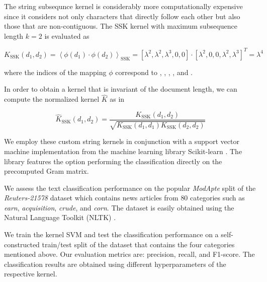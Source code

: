 
The string subsequnce kernel is considerably more computationally expensive since it considers not only characters that directly follow each other but also those that are non-contiguous. The SSK kernel with maximum subsequence length $k = 2$ is evaluated as

\begin{equation} \label{eq:ssk}
  K_\text{SSK}(d_1, d_2) = \left\langle \phi(d_1) \cdot \phi(d_2) \right\rangle_\text{SSK} = [\lambda^2, \lambda^2, \lambda^3, 0, 0] \cdot [\lambda^2, 0, 0, \lambda^2, \lambda^3]^T = \lambda^4
\end{equation}

where the indices of the mapping $\phi$ correspond to , , , , and .

In order to obtain a kernel that is invariant of the document length, we can compute the normalized kernel $\hat{K}$ as in

\begin{equation}
  \hat{K}_\text{SSK}(d_1, d_2) = \frac{K_\text{SSK}(d_1, d_2)}{\sqrt{K_\text{SSK}(d_1, d_1) K_\text{SSK}(d_2, d_2)}}
\end{equation}



We employ these custom string kernels in conjunction with a support vector machine implementation from the machine learning library Scikit-learn \cite{sklearn}. The library features the option performing the classification directly on the precomputed Gram matrix.

We assess the text classification performance on the popular \textit{ModApte} split of the \textit{Reuters-21578} dataset which contains news articles from $80$ categories such as \textit{earn}, \textit{acquisition}, \textit{crude}, and \textit{corn}. The dataset is easily obtained using the Natural Language Toolkit (NLTK) \cite{nltk}.

We train the kernel SVM and test the classification performance on a self-constructed train/test split of the dataset that contains the four categories mentioned above. Our evaluation metrics are: precision, recall, and F1-score. The classification results are obtained using different hyperparameters of the respective kernel.

